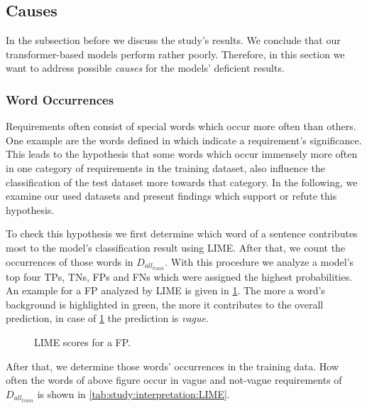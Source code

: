 \subsection{Causes}
\label{chp:study:sec:interpretation:subsec:causes}
In the subsection before we discuss the study's results.
We conclude that our transformer-based models perform rather poorly.
Therefore, in this section we want to address possible \textit{causes} for the models' deficient results.

\subsubsection{Word Occurrences}
\label{chp:study:sec:interpretation:subsec:causes:word_occurrences}
Requirements often consist of special words which occur more often than others.
One example are the words defined in  \parencite{Bradner:1997} which indicate a requirement's significance.
This leads to the hypothesis that some words which occur immensely more often in one category of requirements in the training dataset, also influence the classification of the test dataset more towards that category.
In the following, we examine our used datasets and present findings which support or refute this hypothesis.

To check this hypothesis we first determine which word of a sentence contributes most to the model's classification result using \ac{LIME}.
After that, we count the occurrences of those words in $D_{all_{train}}$.
With this procedure we analyze a model's top four \acp{TP}, \acp{TN}, \acp{FP} and \acp{FN} which were assigned the highest probabilities.
An example for a \ac{FP} analyzed by \ac{LIME} is given in \cref{fig:study:interpretation:LIME}.
The more a word's background is highlighted in green, the more it contributes to the overall prediction, in case of \cref{fig:study:interpretation:LIME} the prediction is \textit{vague}.
\begin{figure}[htpb]
    \centering
    \def\svgwidth{\columnwidth}
    
    \caption[Study Interpretation: Example for LIME]{\Ac{LIME} scores for a \ac{FP}.}\label{fig:study:interpretation:LIME}
\end{figure}

After that, we determine those words' occurrences in the training data.
How often the words of above figure occur in vague and not-vague requirements of $D_{all_{train}}$ is shown in \cref{tab:study:interpretation:LIME}.

